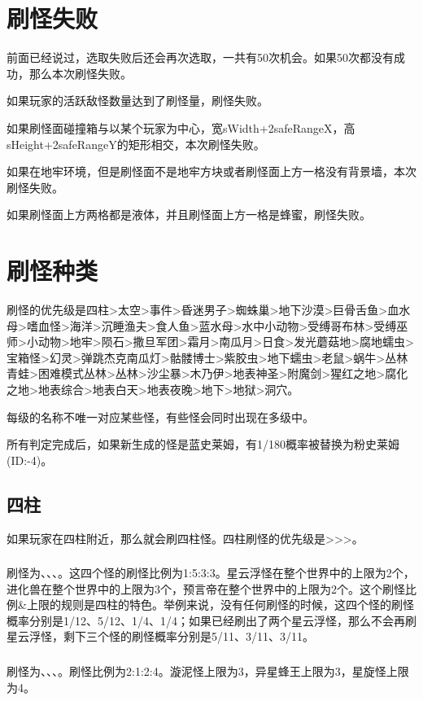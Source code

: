 \section{刷怪失败}
前面已经说过，选取失败后还会再次选取，一共有50次机会。如果50次都没有成功，那么本次刷怪失败。

如果玩家的活跃敌怪数量达到了刷怪量，刷怪失败。

如果刷怪面碰撞箱与以某个玩家为中心，宽sWidth+2safeRangeX，高sHeight+2safeRangeY的矩形相交，本次刷怪失败。

如果在地牢环境，但是刷怪面不是地牢方块或者刷怪面上方一格没有背景墙，本次刷怪失败。

如果刷怪面上方两格都是液体，并且刷怪面上方一格是蜂蜜，刷怪失败。

\section{刷怪种类}
刷怪的优先级是四柱>太空>事件>昏迷男子>蜘蛛巢>地下沙漠>巨骨舌鱼>血水母>嗜血怪>海洋>沉睡渔夫>食人鱼>蓝水母>水中小动物>受缚哥布林>受缚巫师>小动物>地牢>陨石>撒旦军团>霜月>南瓜月>日食>发光蘑菇地>腐地蠕虫>宝箱怪>幻灵>弹跳杰克南瓜灯>骷髅博士>紫胶虫>地下蠕虫>老鼠>蜗牛>丛林青蛙>困难模式丛林>丛林>沙尘暴>木乃伊>地表神圣>附魔剑>猩红之地>腐化之地>地表综合>地表白天>地表夜晚>地下>地狱>洞穴。

每级的名称不唯一对应某些怪，有些怪会同时出现在多级中。

所有判定完成后，如果新生成的怪是蓝史莱姆，有1/180概率被替换为粉史莱姆(ID:-4)。

\subsection{四柱}
如果玩家在四柱附近，那么就会刷四柱怪。四柱刷怪的优先级是>>>。

\subsubsection{}
刷怪为、、、。这四个怪的刷怪比例为1:5:3:3。星云浮怪在整个世界中的上限为2个，进化兽在整个世界中的上限为3个，预言帝在整个世界中的上限为2个。这个刷怪比例\&上限的规则是四柱的特色。举例来说，没有任何刷怪的时候，这四个怪的刷怪概率分别是1/12、5/12、1/4、1/4；如果已经刷出了两个星云浮怪，那么不会再刷星云浮怪，剩下三个怪的刷怪概率分别是5/11、3/11、3/11。

\subsubsection{}
刷怪为、、、。刷怪比例为2:1:2:4。漩泥怪上限为3，异星蜂王上限为3，星旋怪上限为4。

